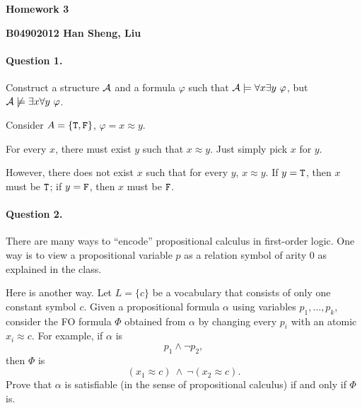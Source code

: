 \documentclass[11pt, a4paper]{article}
\renewcommand{\fulltitle}{Homework 3}
\begin{document}
\date{}




\begin{center}
{\Large {\bf \fulltitle}}
\end{center}
\hfill{\bf B04902012 Han Sheng, Liu}
\vspace{0.7cm}


\paragraph*{Question 1.}
Construct a structure $\mathcal{A}$ and a formula $\varphi$ such that
$\cA \models \forall x \exists y \ \varphi$,
but $\mathcal{A} \not\models \exists x \forall y \ \varphi$.
\begin{framed}
\solution

Consider $A=\{{\tt T}, {\tt F}\}$, $\varphi=x\approx y$. 

For every $x$, there must exist $y$ such that $x \approx y$.
Just simply pick $x$ for $y$.

However, there does not exist $x$ such that for every $y$, $x\approx y$.
If $y={\tt T}$, then $x$ must be ${\tt T}$; if $y={\tt F}$, then $x$ must be ${\tt F}$.
\end{framed}



\paragraph*{Question 2.}
There are many ways to ``encode''
propositional calculus in first-order logic.
One way is to view a propositional variable $p$ as
a relation symbol of arity $0$
as explained in the class.

Here is another way.
Let $L = \{c\}$ be a vocabulary that consists of only one
constant symbol $c$.
Given a propositional formula $\alpha$ 
using variables $p_1,\ldots,p_k$,
consider the FO formula $\Phi$
obtained from $\alpha$ by 
changing every $p_i$ with an atomic $x_i \approx c$.
For example, if $\alpha$ is 
$$p_1\wedge \neg p_2,$$
then $\Phi$ is 
$$
(x_1 \approx c) \ \wedge \ \neg (x_2 \approx c).
$$
Prove that
$\alpha$ is satisfiable (in the sense of propositional calculus)
if and only if $\Phi$ is.
\end{document}
